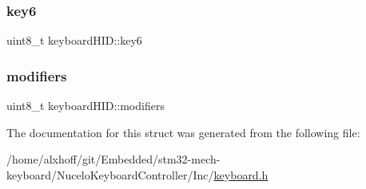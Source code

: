 \subsubsection{\texorpdfstring{key6}{key6}}
{\footnotesize\ttfamily uint8\+\_\+t keyboard\+H\+I\+D\+::key6}

\mbox{\label{structkeyboardHID_af9b16f0982275eddfa430dd71fa64825}} 
\subsubsection{\texorpdfstring{modifiers}{modifiers}}
{\footnotesize\ttfamily uint8\+\_\+t keyboard\+H\+I\+D\+::modifiers}



The documentation for this struct was generated from the following file\+:\begin{DoxyCompactItemize}
\item 
/home/alxhoff/git/\+Embedded/stm32-\/mech-\/keyboard/\+Nucelo\+Keyboard\+Controller/\+Inc/\hyperlink{keyboard_8h}{keyboard.\+h}\end{DoxyCompactItemize}
